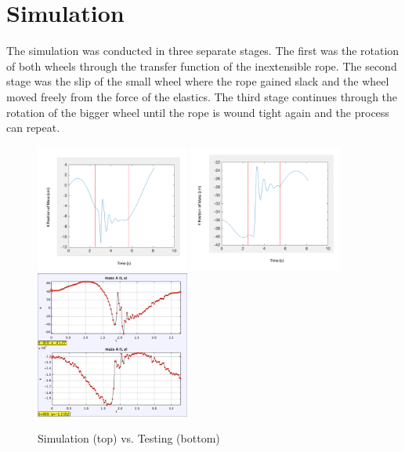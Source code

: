 \documentclass[twoside,twocolumn]{article}
\begin{document}
\section{Simulation}

The simulation was conducted in three separate stages. The first was the rotation of both wheels through the transfer function of the inextensible rope. The second stage was the slip of the small wheel where the rope gained slack and the wheel moved freely from the force of the elastics. The third stage continues through the rotation of the bigger wheel until the rope is wound tight again and the process can repeat.

\begin{figure}[!h]
    \caption{Simulation (top) vs. Testing (bottom)}
    \centering
        \includegraphics[width=0.45\textwidth]{x.png}
    \centering
        \includegraphics[width=0.45\textwidth]{y.png}
    \centering
        \includegraphics[width=0.45\textwidth]{tracking-plots.png}
\end{figure}
\end{document}
